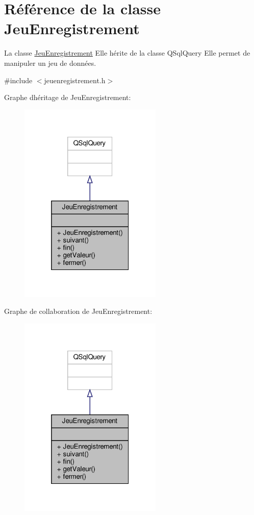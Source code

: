 \hypertarget{class_jeu_enregistrement}{}\section{Référence de la classe Jeu\+Enregistrement}
\label{class_jeu_enregistrement}


La classe \hyperlink{class_jeu_enregistrement}{Jeu\+Enregistrement} Elle hérite de la classe Q\+Sql\+Query Elle permet de manipuler un jeu de données.  




{\ttfamily \#include $<$jeuenregistrement.\+h$>$}



Graphe d\textquotesingle{}héritage de Jeu\+Enregistrement\+:\nopagebreak
\begin{figure}[H]
\begin{center}
\leavevmode
\includegraphics[width=193pt]{class_jeu_enregistrement__inherit__graph}
\end{center}
\end{figure}


Graphe de collaboration de Jeu\+Enregistrement\+:\nopagebreak
\begin{figure}[H]
\begin{center}
\leavevmode
\includegraphics[width=193pt]{class_jeu_enregistrement__coll__graph}
\end{center}
\end{figure}
